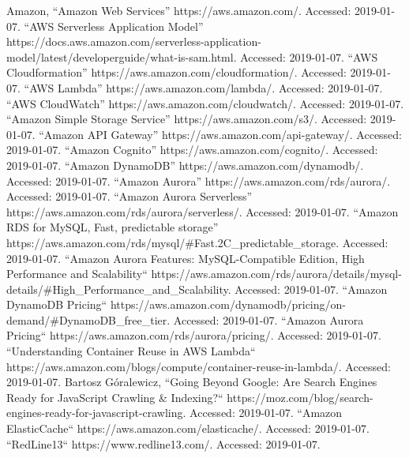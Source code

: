 \documentclass[conference]{IEEEtran}
\begin{document}
\begin{thebibliography}{00}
 Amazon, “Amazon Web Services” https://aws.amazon.com/. Accessed: 2019-01-07.
 “AWS Serverless Application Model” https://docs.aws.amazon.com/serverless-application-model/latest/developerguide/what-is-sam.html. Accessed: 2019-01-07.
 “AWS Cloudformation” https://aws.amazon.com/cloudformation/. Accessed: 2019-01-07.
 “AWS Lambda” https://aws.amazon.com/lambda/. Accessed: 2019-01-07.
 “AWS CloudWatch” https://aws.amazon.com/cloudwatch/. Accessed: 2019-01-07.
 “Amazon Simple Storage Service” https://aws.amazon.com/s3/. Accessed: 2019-01-07.
 “Amazon API Gateway” https://aws.amazon.com/api-gateway/. Accessed: 2019-01-07.
 “Amazon Cognito” https://aws.amazon.com/cognito/. Accessed: 2019-01-07.
 “Amazon DynamoDB” https://aws.amazon.com/dynamodb/. Accessed: 2019-01-07.
 “Amazon Aurora” https://aws.amazon.com/rds/aurora/. Accessed: 2019-01-07.
 “Amazon Aurora Serverless” https://aws.amazon.com/rds/aurora/serverless/. Accessed: 2019-01-07.
 “Amazon RDS for MySQL, Fast, predictable storage” https://aws.amazon.com/rds/mysql/\#Fast.2C\_predictable\_storage. Accessed: 2019-01-07.
 “Amazon Aurora Features: MySQL-Compatible Edition, High Performance and Scalability“ https://aws.amazon.com/rds/aurora/details/mysql-details/\#High\_Performance\_and\_Scalability. Accessed: 2019-01-07.
 “Amazon DynamoDB Pricing“ https://aws.amazon.com/dynamodb/pricing/on-demand/\#DynamoDB\_free\_tier. Accessed: 2019-01-07.
 “Amazon Aurora Pricing“ https://aws.amazon.com/rds/aurora/pricing/. Accessed: 2019-01-07.
 “Understanding Container Reuse in AWS Lambda“ https://aws.amazon.com/blogs/compute/container-reuse-in-lambda/. Accessed: 2019-01-07.
 Bartosz Góralewicz, “Going Beyond Google: Are Search Engines Ready for JavaScript Crawling \& Indexing?“ https://moz.com/blog/search-engines-ready-for-javascript-crawling. Accessed: 2019-01-07.
 “Amazon ElasticCache“ https://aws.amazon.com/elasticache/. Accessed: 2019-01-07.
 “RedLine13“ https://www.redline13.com/. Accessed: 2019-01-07.
\end{thebibliography}
\vspace{12pt}
\end{document}
